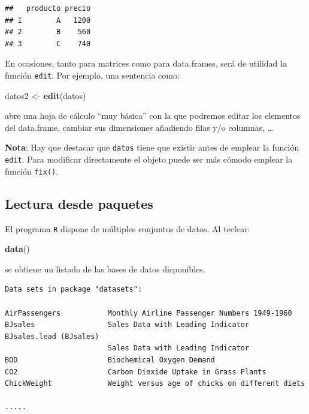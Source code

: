 \documentclass[]{book}
\newenvironment{Shaded}{\begin{snugshade}}{\end{snugshade}}
\newcommand{\KeywordTok}[1]{\textcolor[rgb]{0.13,0.29,0.53}{\textbf{#1}}}
\newcommand{\StringTok}[1]{\textcolor[rgb]{0.31,0.60,0.02}{#1}}
\newcommand{\NormalTok}[1]{#1}
\begin{document}
\begin{verbatim}
##   producto precio
## 1        A   1200
## 2        B    560
## 3        C    740
\end{verbatim}

En ocasiones, tanto para matrices como para data.frames, será de
utilidad la función \texttt{edit}. Por ejemplo, una sentencia como:

\begin{Shaded}
\begin{Highlighting}[]
\NormalTok{datos2 <-}\StringTok{ }\KeywordTok{edit}\NormalTok{(datos)}
\end{Highlighting}
\end{Shaded}

abre una hoja de cálculo ``muy básica'' con la que podremos editar los
elementos del data.frame, cambiar sus dimensiones añadiendo filas y/o
columnas, \ldots{}

\textbf{Nota}: Hay que destacar que \texttt{datos} tiene que existir
antes de emplear la función \texttt{edit}. Para modificar directamente
el objeto puede ser más cómodo emplear la función \texttt{fix()}.

\subsection{Lectura desde paquetes}\label{lectura-desde-paquetes}

El programa \texttt{R} dispone de múltiples conjuntos de datos. Al
teclear:

\begin{Shaded}
\begin{Highlighting}[]
\KeywordTok{data}\NormalTok{()}
\end{Highlighting}
\end{Shaded}

se obtiene un listado de las bases de datos disponibles.

\begin{verbatim}
Data sets in package "datasets":

AirPassengers           Monthly Airline Passenger Numbers 1949-1960
BJsales                 Sales Data with Leading Indicator
BJsales.lead (BJsales)
                        Sales Data with Leading Indicator
BOD                     Biochemical Oxygen Demand
CO2                     Carbon Dioxide Uptake in Grass Plants
ChickWeight             Weight versus age of chicks on different diets

.....
\end{verbatim}
\end{document}
